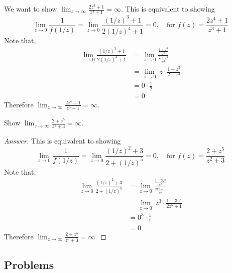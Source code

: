 \vspace*{1em}

\begin{example}
We want to show $\displaystyle \lim_{z \to \infty} \frac{2z^4 + 1}{z^3 + 1} = \infty$. This is equivalent to showing
\[\lim_{z \to 0} \frac{1}{f(1/z)} = \lim_{z \to 0} \frac{(1/z)^3 + 1}{2(1/z)^4 + 1} = 0,\quad \text{for }f(z) = \frac{2z^4 + 1}{z^3 + 1}\]
Note that,
\begin{align*}
\lim_{z \to 0} \frac{(1/z)^3 + 1}{2(1/z)^4 + 1}&= \lim_{z \to 0} \frac{\frac{1 + z^3}{z^3}}{\frac{2 + z^4}{z^4}}\\[0.5em]
&= \lim_{z \to 0}\ z\cdot\frac{1 + z^3}{2 + z^4}\\[0.5em]
&= 0\cdot\frac{1}{2}\\[0.5em]
&= 0
\end{align*}
Therefore $\displaystyle \lim_{z \to \infty} \frac{2z^4 + 1}{z^3 + 1} = \infty$.
\end{example}

\vspace*{1em}

\begin{example}[in-class]
Show $\displaystyle \lim_{z \to \infty} \frac{2 + z^5}{z^2 + 3} = \infty$.
\end{example}
\begin{proof}[Answer]
This is equivalent to showing
\[\lim_{z \to 0} \frac{1}{f(1/z)} = \lim_{z \to 0} \frac{(1/z)^2 + 3}{2 + (1/z)^5} = 0,\quad \text{for }f(z) = \frac{2 + z^5}{z^2 + 3}\]
Note that,
\begin{align*}
\lim_{z \to 0} \frac{(1/z)^2 + 3}{2 + (1/z)^5} &= \lim_{z \to 0} \frac{\frac{1 + 3z^2}{z^2}}{\frac{2z^5 + 1}{z^5}}\\[0.5em]
&= \lim_{z \to 0}\ z^3\cdot\frac{1 + 3z^2}{2z^5 + 1}\\[0.5em]
&= 0^3\cdot\frac{1}{1}\\[0.5em]
&= 0
\end{align*}
Therefore $\displaystyle \lim_{z \to \infty} \frac{2 + z^5}{z^2 + 3} = \infty$.
\end{proof}

\vspace*{0.2in}

\subsection{Problems}
\vspace{0.1in}

